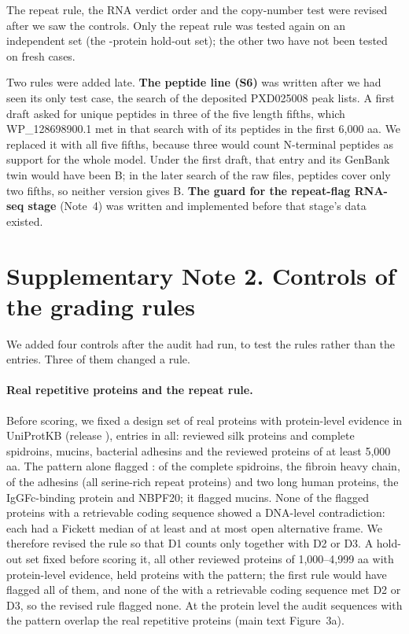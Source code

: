 \documentclass[11pt]{article}
\begin{document}
The repeat rule, the RNA verdict order and the copy-number test were revised after we saw the controls. Only the repeat rule
was tested again on an independent set (the -protein hold-out set); the other two have not been tested on fresh
cases.

Two rules were added late. \textbf{The peptide line (S6)} was written after we had seen its only test case, the search of the
deposited PXD025008 peak lists. A first draft asked for unique peptides in three of the five length fifths, which
WP\_128698900.1 met in that search with  of its  peptides in the first
6,000 aa. We replaced it with all five fifths, because three would count N-terminal peptides as support for the whole
model. Under the first draft, that entry and its GenBank twin would have been B; in the later search of the raw files,
peptides cover only two fifths, so neither version gives B. \textbf{The guard for the repeat-flag RNA-seq stage} (Note~4)
was written and implemented before that stage's data existed.

\section*{Supplementary Note 2. Controls of the grading rules}

We added four controls after the audit had run, to test the rules rather than the entries. Three of them changed a rule.

\paragraph{Real repetitive proteins and the repeat rule.} Before scoring, we fixed a design set of real proteins with
protein-level evidence in UniProtKB (release ),  entries in all:  reviewed silk
proteins and  complete spidroins,  mucins,  bacterial adhesins and the
 reviewed proteins of at least 5,000 aa. The pattern alone flagged :
 of the  complete spidroins, the  fibroin heavy chain,
 of the  adhesins (all serine-rich repeat proteins) and two long human proteins, the
IgGFc-binding protein and NBPF20; it flagged  mucins. None of the  flagged
proteins with a retrievable coding sequence showed a DNA-level contradiction: each had a Fickett median of at least
 and at most  open alternative frame. We therefore revised the rule so
that D1 counts only together with D2 or D3. A hold-out set fixed before scoring it, all  other reviewed proteins of
1,000--4,999 aa with protein-level evidence, held  proteins with the pattern; the first rule would have
flagged all of them, and none of the  with a retrievable coding sequence met D2 or D3, so the revised rule
flagged none. At the protein level the audit sequences with the pattern overlap the real repetitive proteins (main text Figure~3a).
\end{document}
